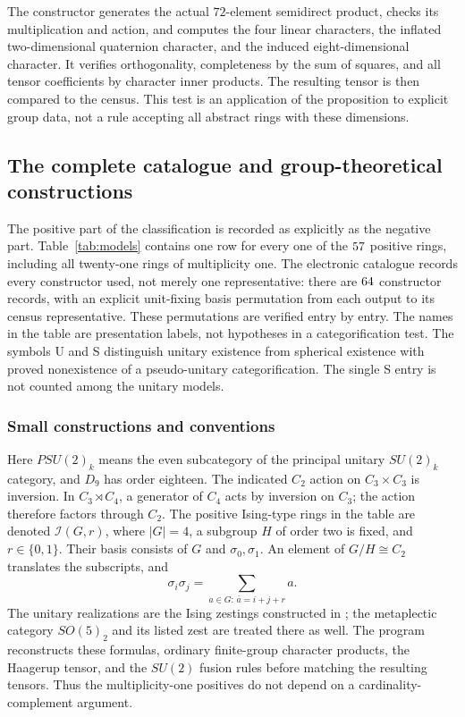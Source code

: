 The constructor generates the actual $72$-element semidirect product,
checks its multiplication and action, and computes the four linear
characters, the inflated two-dimensional quaternion character, and
the induced eight-dimensional character. It verifies orthogonality,
completeness by the sum of squares, and all tensor coefficients by
character inner products. The resulting tensor is then compared to the
census. This test is an application of the proposition to explicit
group data, not a rule accepting all abstract rings with these dimensions.

\subsection{The complete catalogue and group-theoretical constructions}\label{sec:model-catalogue}
The positive part of the classification is recorded as explicitly as the
negative part. Table~\ref{tab:models} contains one row for every one of the
$57$ positive rings, including all twenty-one rings of
multiplicity one. The electronic catalogue records every constructor used,
not merely one representative: there are $64$ constructor records,
with an explicit unit-fixing basis permutation from each output to its
census representative. These permutations are verified entry by entry.
The names in the table are presentation labels, not hypotheses in a
categorification test. The symbols U and S distinguish unitary existence
from spherical existence with proved nonexistence of a pseudo-unitary
categorification. The single S entry is not counted among the unitary
models.

\subsubsection{Small constructions and conventions}
Here $PSU(2)_k$ means the even subcategory of the principal unitary
$SU(2)_k$ category, and $D_9$ has order eighteen. The indicated $C_2$ action
on $C_3\times C_3$ is inversion. In $C_3\rtimes C_4$, a generator of $C_4$
acts by inversion on $C_3$; the action therefore factors through $C_2$.
The positive Ising-type rings in the table are denoted $\mathcal I(G,r)$,
where $|G|=4$, a subgroup $H$ of order two is fixed, and $r\in\{0,1\}$.
Their basis consists of $G$ and $\sigma_0,\sigma_1$. An element of
$G/H\cong C_2$ translates the subscripts, and
\[
 \sigma_i\sigma_j=\sum_{a\in G:\,\bar a=i+j+r}a.
\]
The unitary realizations are the Ising zestings constructed in
\cite[Section~4.3]{LPR}; the metaplectic category $SO(5)_2$ and its listed
zest are treated there as well. The program reconstructs these formulas,
ordinary finite-group character products, the Haagerup tensor, and the
$SU(2)$ fusion rules before matching the resulting tensors. Thus the
multiplicity-one positives do not depend on a cardinality-complement
argument.


